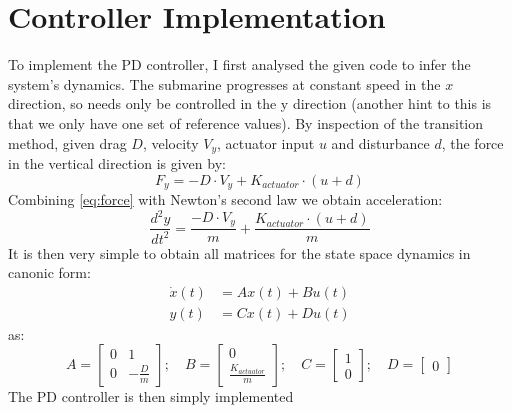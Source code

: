 \documentclass[hidelinks]{article}
\begin{document}
\section{Controller Implementation}
To implement the PD controller, I first analysed the given code to infer the system's dynamics. The submarine progresses at constant speed in the $x$ direction, so needs only be controlled in the y direction (another hint to this is that we only have one set of reference values).
\newline
By inspection of the transition method, given drag $D$, velocity $V_y$, actuator input $u$ and disturbance $d$, the force in the vertical direction is given by:
%
\begin{equation}
    F_y = - D \cdot V_y + K_{actuator} \cdot (u + d) \label{eq:force}
\end{equation}
%
Combining \eqref{eq:force} with Newton's second law we obtain acceleration:
%
\begin{equation}
    \frac{d^2y}{dt^2} = \frac{- D \cdot V_y}{m} + \frac{K_{actuator} \cdot (u + d)}{m} \label{eq:force}
\end{equation}
%
It is then very simple to obtain all matrices for the state space dynamics in canonic form:
\begin{equation}
    \begin{aligned}
        \dot{x}(t) &= A x(t) + B u(t) \\
        y(t) &= C x(t) + D u(t)
    \end{aligned}
    \label{eq:statespace}
\end{equation}
%
as:
%
\begin{equation}
    \displaystyle
    A = \begin{bmatrix}
            0 & 1 \\
            0 & -\frac{D}{m}
        \end{bmatrix}; \quad
    B = \begin{bmatrix}
            0 \\
            \frac{K_{actuator}}{m}
        \end{bmatrix}; \quad
    C = \begin{bmatrix}
            1 \\
            0
          \end{bmatrix}; \quad
    D = \begin{bmatrix}
            0
        \end{bmatrix}
\end{equation}
%
The PD controller is then simply implemented
%
\end{document}
